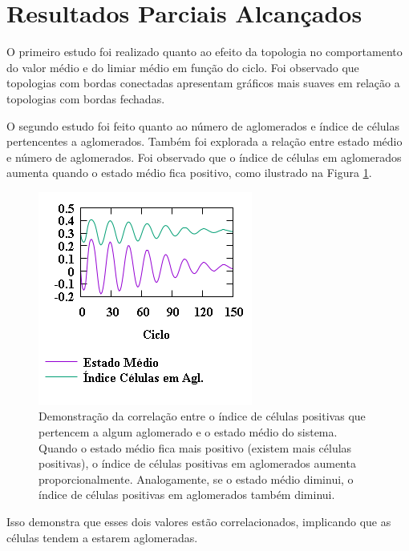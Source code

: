 \documentclass[11pt,a4paper,twocolumn,final]{article}
\begin{document}
\section*{Resultados Parciais Alcançados}

O primeiro estudo foi realizado quanto ao efeito da topologia no comportamento do valor médio e do limiar médio em função do ciclo. Foi observado que topologias com bordas conectadas apresentam gráficos mais suaves em relação a topologias com bordas fechadas. %

%

O segundo estudo foi feito quanto ao número de aglomerados e índice de células pertencentes a aglomerados. Também foi explorada a relação entre estado médio e número de aglomerados. Foi observado que o índice de células em aglomerados aumenta quando o estado médio fica positivo, como ilustrado na Figura \ref{fig:dataL2000Q100CellInClusterAvgStateVsCycle}. 
\begin{figure}[h]
    \centering
    \includegraphics[width=.9\linewidth]{dataL2000Q100CellInClusterAvgStateVsCycle.png}
    \caption{Demonstração da correlação entre o índice de células positivas que pertencem a algum aglomerado e o estado médio do sistema. Quando o estado médio fica mais positivo (existem mais células positivas), o índice de células positivas em aglomerados aumenta proporcionalmente. Analogamente, se o estado médio diminui, o índice de células positivas em aglomerados também diminui.}
    \label{fig:dataL2000Q100CellInClusterAvgStateVsCycle}
\end{figure}
Isso demonstra que esses dois valores estão correlacionados, implicando que as células tendem a estarem aglomeradas. 
\end{document}
